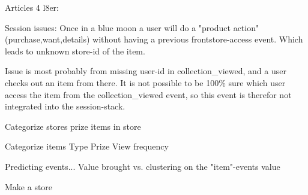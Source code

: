 
Articles 4 l8er:

Session issues:
Once in a blue moon a user will do a "product action" (purchase,want,details)
without having a previous frontstore-access event. Which leads to unknown
store-id of the item.

Issue is most probably from missing user-id in collection\_viewed, and a user
checks out an item from there. It is not possible to be 100\% sure which user
access the item from the collection\_viewed event, so this event is therefor
not integrated into the session-stack.


Categorize stores
    prize
    items in store

Categorize items
    Type
    Prize
    View frequency

Predicting events...
    Value brought vs. clustering on the "item"-events value

Make a store









